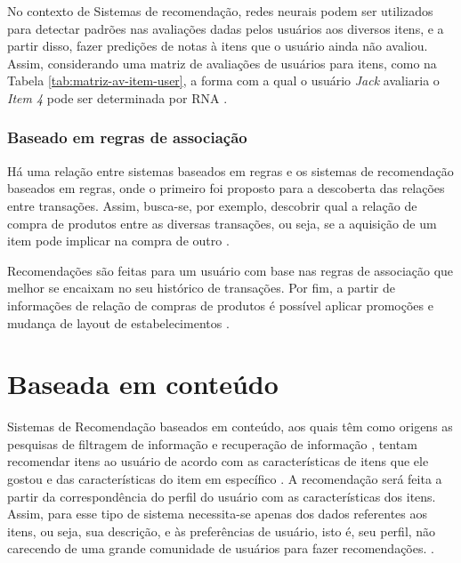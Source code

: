         No contexto de Sistemas de recomendação, redes neurais podem ser utilizados para detectar padrões nas avaliações dadas pelos usuários aos diversos itens, e a partir disso, fazer predições de notas à itens que o usuário ainda não avaliou. Assim, considerando uma matriz de avaliações de usuários para itens, como na Tabela \ref{tab:matriz-av-item-user}, a forma com a qual o usuário \textit{Jack} avaliaria o \textit{Item 4} pode ser determinada por RNA \cite{Ricci2010}.
                  
        \subsubsection{Baseado em regras de associação}
        
        Há uma relação entre sistemas baseados em regras e os sistemas de recomendação baseados em regras, onde o primeiro foi proposto para a descoberta das relações entre transações. Assim, busca-se, por exemplo, descobrir qual a relação de compra de produtos entre as diversas transações, ou seja, se a aquisição de um item pode implicar na compra de outro \cite{Aggarwal2016}.  
        
        Recomendações são feitas para um usuário com base nas regras de associação que melhor se encaixam no seu histórico de transações.
        Por fim, a partir de informações de relação de compras de produtos é possível aplicar promoções e mudança de layout de estabelecimentos \cite{Jannach2010}.
            
\section{Baseada em conteúdo}

    Sistemas de Recomendação baseados em conteúdo, aos quais têm como origens as pesquisas de filtragem de informação e recuperação de informação \cite{Cazella2010}, tentam recomendar itens ao usuário de acordo com as características de itens que ele gostou e das características do item em específico \cite{Ricci2010}. A recomendação será feita a partir da correspondência do perfil do usuário com as características dos itens. Assim, para esse tipo de sistema necessita-se apenas dos dados referentes aos itens, ou seja, sua descrição, e às preferências de usuário, isto é, seu perfil, não carecendo de uma grande comunidade de usuários para fazer recomendações. \cite{Jannach2010}. 

